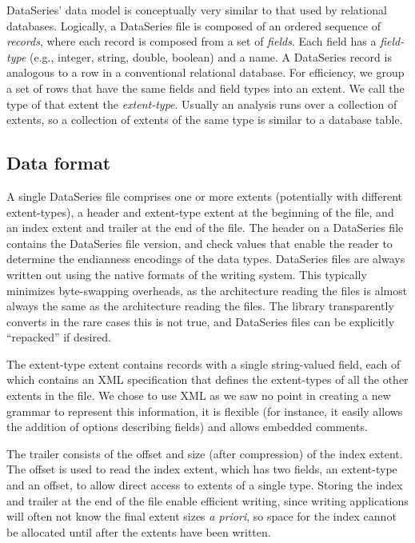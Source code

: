 \documentclass{acm_proc_article-sp}
\begin{document}
DataSeries' data model is conceptually very similar to that used by
relational databases.  Logically, a DataSeries file is composed of an
ordered sequence of {\it records}, where each record is composed from
a set of {\it fields}. Each field has a {\it field-type} (e.g.,
integer, string, double, boolean) and a name. A DataSeries record is
analogous to a row in a conventional relational database. For
efficiency, we group a set of rows that have the same fields and field
types into an extent.  We call the type of that extent the {\it
extent-type}.  Usually an analysis 
runs over a collection of
extents, so a collection of extents of the same type is similar to a
database table.

\subsection{Data format}

A single DataSeries file comprises one or more extents
(potentially with different extent-types), a header and
extent-type extent at the beginning of the file, and an index extent
and trailer at the end of the file. The header on a DataSeries file 
contains the DataSeries
file version, and check values that enable the reader to determine the
endianness encodings of the data types.  DataSeries files are always
written out using the native formats of the writing system. This 
typically minimizes byte-swapping overheads, as the architecture 
reading the files is almost always the same as the architecture reading
the files. The library transparently converts in the rare cases this
is not true, and DataSeries files can be explicitly ``repacked'' if desired. 

The extent-type extent contains records with a single string-valued
field, each of which contains an XML specification that defines the
extent-types of all the other extents in the file. We chose to use XML
as we saw no point in creating a new
grammar 
to represent this information, it is flexible (for
instance, it easily allows the addition of options describing
fields) and allows embedded comments.

The trailer
consists of the offset and size (after compression) of the index
extent.  The offset is used to read the index extent, which has two
fields, an extent-type and an offset, to allow direct access to
extents of a single type. Storing the index and trailer at the end
of the file enable efficient writing, since writing applications will
often not know
the final extent sizes \textit{a priori},
so space 
for the index cannot be allocated until after the extents have been written.
\end{document}
